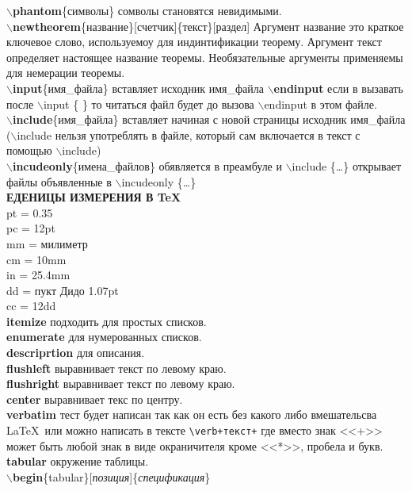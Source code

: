 \documentclass{article}
\newcommand{\bs}{$\backslash$}
\newcommand{\bd}[1]{{\bfseries #1}} %
\newcommand{\bb}[1]{\bd{\bs #1}} %
\begin{document}
\bb{phantom}\{символы\} сомволы становятся невидимыми.\\
\bb{newtheorem}\{название\}[счетчик]\{текст\}[раздел] Аргумент название это
краткое ключевое слово, используемоу для индинтификации теорему.
Аргумент текст определяет настоящее название теоремы. Необязательные аргументы
применяемы для немерации теоремы.\\

\bb{input}\{имя\_файла\}  вставляет исходник имя\_файла
\bb{endinput} если в вызавать после \bs input \{ \} то читаться файл будет до
вызова \bs endinput в этом файле.\\
\bb{include}\{имя\_файла\} вставляет начиная с новой страницы исходник
имя\_файла (\bs include нельзя употреблять в файле,
который сам включается в текст с помощью \bs include)\\
\bb{incudeonly}\{имена\_файлов\} обявляется в преамбуле и \bs include \{\ldots\}
открывает файлы объявленные в \bs incudeonly \{\ldots\}\\

\bd{ЕДЕНИЦЫ ИЗМЕРЕНИЯ В \TeX}\\
pt = 0.35\\
pc = 12pt\\
mm = милиметр\\
cm = 10mm\\
in = 25.4mm\\
dd = пукт Дидо 1.07pt\\
cc = 12dd\\

\bd{itemize} подходить для простых списков.\\
\bd{enumerate} для нумерованных списков.\\
\bd{descriprtion} для описания.\\
\bd{flushleft} выравнивает текст по левому краю.\\
\bd{flushright} выравнивает текст по левому краю.\\
\bd{center} выравнивает текс по центру.\\
\bd{verbatim} тест будет написан так как он есть без какого либо вмешательсва
\LaTeX~или можно написать в тексте \verb|\verb+текст+| где вместо знак <<+>>
может быть любой знак в виде окраничителя кроме <<*>>, пробела и букв.\\

\bd{tabular} окружение таблицы.\\
\bb{begin}\{tabular\}[\emph{позиция}]\{\emph{спецификация}\}\\
\end{document}
